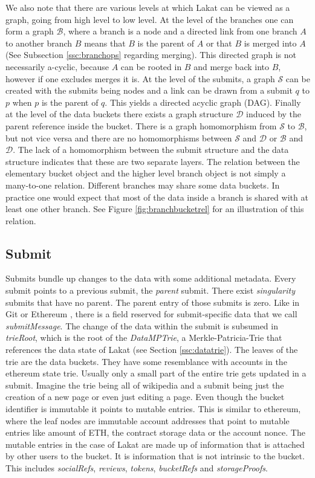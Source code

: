 We also note that there are various levels at which Lakat can be viewed as a graph, going from high level to low level. At the level of the branches one can form a graph $\mathcal B$, where a branch is a node and a directed link from one branch $A$ to another branch $B$ means that $B$ is the parent of $A$ or that $B$ is merged into $A$ (See Subsection \ref{ssc:branchops} regarding merging). This directed graph is not necessarily a-cyclic, because $A$ can be rooted in $B$ and merge back into $B$, however if one excludes merges it is. At the level of the submits, a graph $\mathcal S$ can be created with the submits being nodes and a link can be drawn from a submit $q$ to $p$ when $p$ is the parent of $q$. This yields a directed acyclic graph (DAG). Finally at the level of the data buckets there exists a graph structure $\mathcal D$ induced by the parent reference inside the bucket. There is a graph homomorphism from $\mathcal S$ to $\mathcal B$, but not vice versa and there are no homomorphisms between $\mathcal S$ and $\mathcal D$ or $\mathcal B$ and $\mathcal D$. The lack of a homomorphism between the submit structure and the data structure indicates that these are two separate layers. The relation between the elementary bucket object and the higher level branch object is not simply a many-to-one relation. Different branches may share some data buckets. In practice one would expect that most of the data inside a branch is shared with at least one other branch. See Figure \ref{fig:branchbucketrel} for an illustration of this relation.



\subsection{Submit}
\label{ssc:submit}
Submits bundle up changes to the data with some additional metadata. Every submit points to a previous submit, the \textit{parent} submit. There exist \textit{singularity} submits that have no parent. The parent entry of those submits is zero. Like in Git \cite{chacon2014pro} or Ethereum \cite{buterin2013ethereum}, there is a field reserved for submit-specific data that we call \textit{submitMessage}. The change of the data within the submit is subsumed in \textit{trieRoot}, which is the root of the \textit{DataMPTrie}, a Merkle-Patricia-Trie that references the data state of Lakat (see Section \ref{ssc:datatrie}). The leaves of the trie are the data buckets. They have some resemblance with accounts in the ethereum state trie. Usually only a small part of the entire trie gets updated in a submit. Imagine the trie being all of wikipedia and a submit being just the creation of a new page or even just editing a page. Even though the bucket identifier is immutable it points to mutable entries. This is similar to ethereum, where the leaf nodes are immutable account addresses that point to mutable entries like amount of ETH, the contract storage data or the account nonce. The mutable entries in the case of Lakat are made up of information that is attached by other users to the bucket. It is information that is not intrinsic to the bucket. This includes \textit{socialRefs}, \textit{reviews}, \textit{tokens}, \textit{bucketRefs} and \textit{storageProofs}. 

